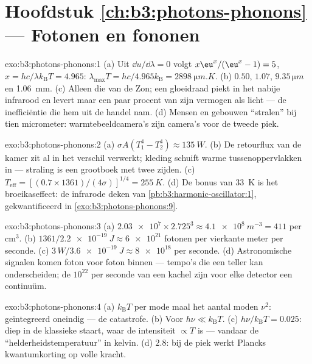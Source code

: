 \section*{Hoofdstuk \ref{ch:b3:photons-phonons} --- Fotonen en fononen}

\begin{solution}{exo:b3:photons-phonons:1}
(a) Uit $\dd u/\dd\lambda = 0$ volgt $x\eu^x/(\eu^x - 1) = 5$,
$x = hc/\lambda k_{\text{B}}T = 4.965$: $\lambda_{\max}T =
hc/4.965k_{\text{B}} = \qty{2898}{\micro m.K}$. (b) $0.50$,
$1.07$, $9.35\,\unit{\micro m}$ en \qty{1.06}{mm}. (c) Alleen die
van de Zon; een gloeidraad piekt in het nabije infrarood en levert
maar een paar procent van zijn vermogen als licht --- de
inefficiëntie die hem uit de handel nam. (d) Mensen en gebouwen
``stralen'' bij tien micrometer: warmtebeeldcamera's zijn camera's
voor de tweede piek.
\end{solution}

\begin{solution}{exo:b3:photons-phonons:2}
(a) $\sigma A(T_1^4 - T_2^4) \approx \qty{135}{W}$. (b) De
retourflux van de kamer zit al in het verschil verwerkt; kleding
schuift warme tussenoppervlakken in --- straling is een grootboek
met twee zijden. (c)
$T_{\text{eff}} = [(0.7 \times 1361)/(4\sigma)]^{1/4} =
\qty{255}{K}$. (d) De bonus van \qty{33}{K} is het broeikaseffect:
de infrarode deken van
\cref{pb:b3:harmonic-oscillator:1}, gekwantificeerd in
\cref{exo:b3:photons-phonons:9}.
\end{solution}

\begin{solution}{exo:b3:photons-phonons:3}
(a) $\num{2.03e7} \times 2.725^3 \approx \qty{4.1e8}{m^{-3}} =
411$ per cm$^3$. (b) $1361/\qty{2.2e-19}{J} \approx
\num{6e21}$ fotonen per vierkante meter per seconde. (c) $3\,\unit{W}/
\qty{3.6e-19}{J} \approx \num{8e18}$ per seconde. (d) Astronomische
signalen komen foton voor foton binnen --- tempo's die een teller
kan onderscheiden; de $10^{22}$ per seconde van een kachel zijn
voor elke detector een continuüm.
\end{solution}

\begin{solution}{exo:b3:photons-phonons:4}
(a) $k_{\text{B}}T$ per mode maal het aantal moden $\nu^2$:
geïntegreerd oneindig --- de catastrofe. (b) Voor $h\nu \ll
k_{\text{B}}T$. (c) $h\nu/k_{\text{B}}T = 0.025$: diep in de
klassieke staart, waar de intensiteit $\propto T$ is --- vandaar
de ``helderheidstemperatuur'' in kelvin. (d) $2.8$: bij de piek
werkt Plancks kwantumkorting op volle kracht.
\end{solution}

